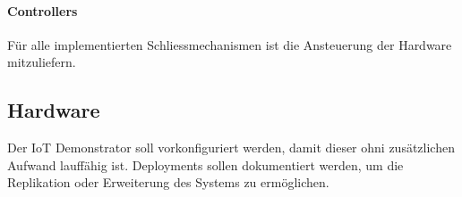 \paragraph{Controllers}
Für alle implementierten Schliessmechanismen ist die Ansteuerung der Hardware mitzuliefern.

\subsection{Hardware}
Der IoT Demonstrator soll vorkonfiguriert werden, damit dieser ohni zusätzlichen Aufwand lauffähig ist. Deployments sollen dokumentiert werden, um die Replikation oder Erweiterung des Systems zu ermöglichen.